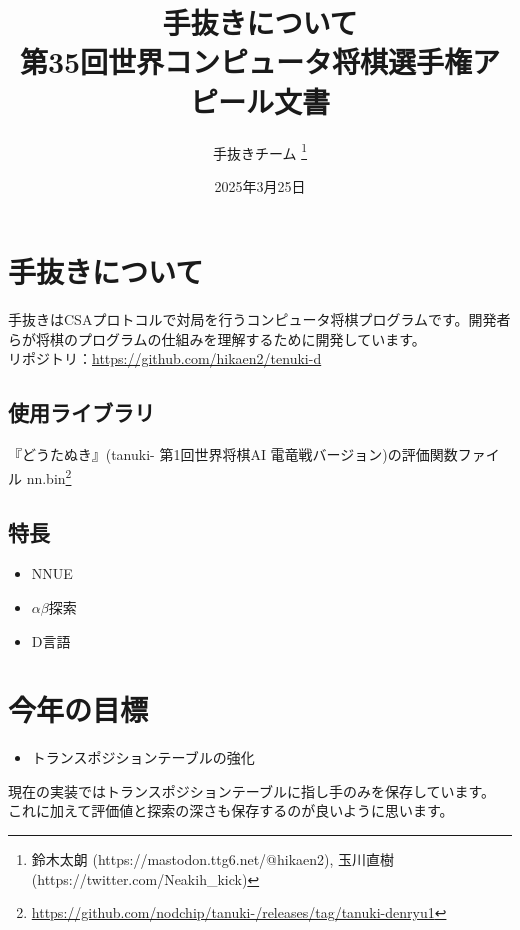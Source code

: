 \documentclass[11pt,a4paper]{ltjsarticle}
\title{
  手抜きについて
  \large{\\ 第35回世界コンピュータ将棋選手権アピール文書}
}
\author{手抜きチーム \thanks{鈴木太朗 (https://mastodon.ttg6.net/@hikaen2), 玉川直樹 (https://twitter.com/Neakih\_kick)} }
\date{2025年3月25日}
\begin{document}
\maketitle


\section*{手抜きについて}

手抜きはCSAプロトコルで対局を行うコンピュータ将棋プログラムです。開発者らが将棋のプログラムの仕組みを理解するために開発しています。 \\
リポジトリ：\url{https://github.com/hikaen2/tenuki-d}


\subsection*{使用ライブラリ}

『どうたぬき』(tanuki- 第1回世界将棋AI 電竜戦バージョン)の評価関数ファイル nn.bin\footnote{\url{https://github.com/nodchip/tanuki-/releases/tag/tanuki-denryu1}}


\subsection*{特長}

\begin{itemize}
  \item NNUE
  \item $\alpha\beta$探索
  \item D言語
\end{itemize}


\section*{今年の目標}

\begin{itemize}
  \item トランスポジションテーブルの強化
\end{itemize}

現在の実装ではトランスポジションテーブルに指し手のみを保存しています。
これに加えて評価値と探索の深さも保存するのが良いように思います。
\end{document}
